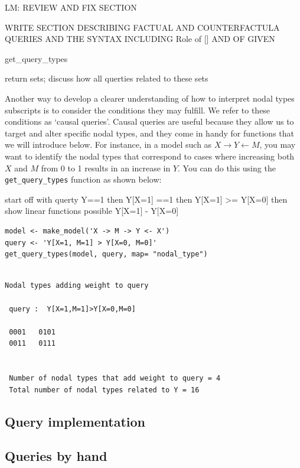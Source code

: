 \documentclass[
  article]{jss}
\begin{document}
LM: REVIEW AND FIX SECTION

WRITE SECTION DESCRIBING FACTUAL AND COUNTERFACTULA QUERIES AND THE
SYNTAX INCLUDING Role of {[}{]} AND OF GIVEN

get\_query\_types

return sets; discuss how all querties related to these sets

Another way to develop a clearer understanding of how to interpret nodal
types subscripts is to consider the conditions they may fulfill. We
refer to these conditions as `causal queries'. Causal queries are useful
because they allow us to target and alter specific nodal types, and they
come in handy for functions that we will introduce below. For instance,
in a model such as \(X \rightarrow Y \leftarrow M\), you may want to
identify the nodal types that correspond to cases where increasing both
\(X\) and \(M\) from 0 to 1 results in an increase in \(Y\). You can do
this using the \texttt{get\_query\_types} function as shown below:

start off with querty Y==1 then Y{[}X=1{]} ==1 then Y{[}X=1{]}
\textgreater= Y{[}X=0{]} then show linear functions possible Y{[}X=1{]}
- Y{[}X=0{]}

\begin{verbatim}
model <- make_model('X -> M -> Y <- X')
query <- 'Y[X=1, M=1] > Y[X=0, M=0]'
get_query_types(model, query, map= "nodal_type")
\end{verbatim}

\begin{verbatim}

Nodal types adding weight to query

 query :  Y[X=1,M=1]>Y[X=0,M=0] 

 0001   0101
 0011   0111


 Number of nodal types that add weight to query = 4
 Total number of nodal types related to Y = 16
\end{verbatim}

\hypertarget{query-implementation}{%
\subsection{Query implementation}\label{query-implementation}}

\hypertarget{queries-by-hand}{%
\subsection{Queries by hand}\label{queries-by-hand}}
\end{document}
